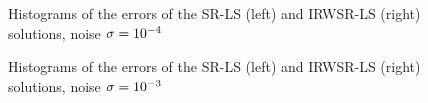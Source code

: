 \begin{figure}[h]
\centering
\caption{Histograms of the errors of the SR-LS (left) and IRWSR-LS (right) solutions, noise $\protect\sigma = 10^{-4}$}
\label{fig:Noise04IRDW}
\end{figure}

\begin{figure}%
\centering
\caption{Histograms of the errors of the SR-LS (left) and IRWSR-LS (right) solutions, noise $\protect\sigma = 10^{-3}$}
\label{fig:Noise03IRDW}
\end{figure}

